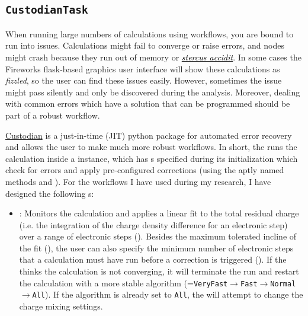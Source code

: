 \begin{refsection}
\subsection{\texttt{CustodianTask}} \label{automation:sec-CustodianTask}

When running large numbers of calculations using workflows, you are bound to run into issues. Calculations might fail to converge or raise errors, and nodes might crash because they run out of memory or \href{https://www.urbandictionary.com/define.php?term=stercus\%20accidit}{\textcolor{black}{\textit{stercus accidit}}}. In some cases the Fireworks flask-based graphics user interface will show these calculations as \textit{fizzled}, so the user can find these issues easily. However, sometimes the issue might pass silently and only be discovered during the analysis. Moreover, dealing with common errors which have a solution that can be programmed should be part of a robust workflow.

\href{https://materialsproject.github.io/custodian/}{Custodian} is a just-in-time (JIT) python package for automated error recovery and allows the user to make much more robust workflows. In short, the  runs the calculation inside a  instance, which has s specified during its initialization which check for errors and apply pre-configured corrections (using the aptly named methods  and ). For the workflows I have used during my research, I have designed the following s:

\begin{itemize}

\item {}: Monitors the calculation and applies a linear fit to the total residual charge (i.e. the integration of the charge density difference for an electronic step) over a range of electronic steps (). Besides the maximum tolerated incline of the fit (), the user can also specify the minimum number of electronic steps that a calculation must have run before a correction is triggered (). If the  thinks the calculation is not converging, it will terminate the run and restart the calculation with a more stable algorithm (=\texttt{VeryFast}$\rightarrow$\texttt{Fast}$\rightarrow$\texttt{Normal}$\rightarrow$\texttt{All}). If the algorithm is already set to \texttt{All}, the  will attempt to change the charge mixing settings.


\end{itemize}
\end{refsection}
